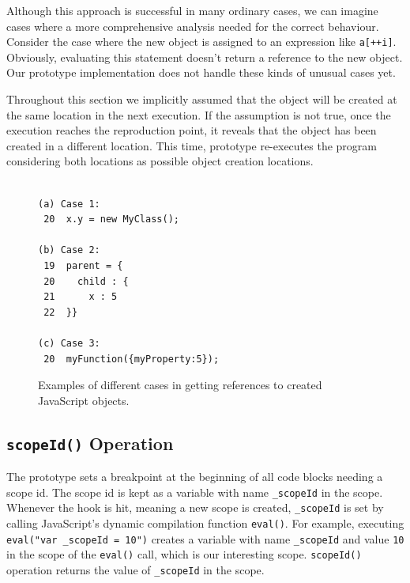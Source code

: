 \documentclass{sig-alternate}
\begin{document}

Although this approach is successful in many ordinary cases, we can imagine 
cases where a more comprehensive analysis needed for the correct behaviour.
Consider the case where the new object is assigned to an expression like \texttt{a[++i]}. 
Obviously, evaluating this statement doesn't return
a reference to the new object. Our prototype implementation does not handle these kinds of unusual cases yet.

Throughout this section we implicitly assumed that the object will be created at 
the same location in the next execution. If the assumption is
not true, once the execution reaches the reproduction point, it
reveals that the object has been created in a different location. This time,
prototype re-executes the program considering both locations as possible 
object creation locations.

\begin{figure}[htp]
\lstset{basicstyle=\scriptsize}
\begin{lstlisting}[frame=single, language=myLang]% framerule=0pt]

(a) Case 1:
 20  x.y = new MyClass();

(b) Case 2:
 19  parent = {
 20    child : {
 21      x : 5
 22  }}

(c) Case 3:
 20  myFunction({myProperty:5});

\end{lstlisting} 


\caption{Examples of different cases in getting references to created JavaScript objects.}
\label{fig:objectCreation}
\end{figure}

\subsection{{\normalsize\bf\texttt{scopeId()}} Operation}
The prototype sets a breakpoint at the beginning of all code blocks needing
a scope id. The scope id is kept as a variable with name 
\texttt{\_scopeId} in the scope. Whenever the hook is hit,  meaning a new scope
is created, \texttt{\_scopeId} is set by calling JavaScript's dynamic compilation 
function \texttt{eval()}. For example, executing \texttt{eval("var \_scopeId = 10")} creates a
variable with name \texttt{\_scopeId} and value \texttt{10} in the
scope of the \texttt{eval()} call, which is our interesting scope. \texttt{scopeId()}
operation returns the value of \texttt{\_scopeId} in the scope.
\end{document}
